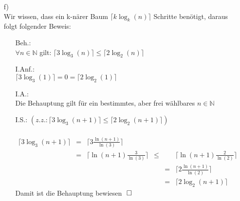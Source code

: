 \documentclass[a4paper,11pt,fleqn]{scrartcl}
\begin{document}
\begin{enumerate}
\begin{enumerate}
			\item[f)]\quad \\
				Wir wissen, dass ein k-närer Baum $\lceil k\log_k(n)\rceil$ Schritte benötigt, 
				daraus folgt folgender Beweis:
				\begin{enumerate}
					\item[Beh.:]\quad \\
						\(\forall n\in\mathbb{N}\) gilt: \(\lceil 3\log_3(n)\rceil\leq 
						\lceil 2\log_2(n)\rceil\)
					\item[I.Anf.:]\quad \\
						\(\lceil 3\log_3(1)\rceil = 0 = \lceil 2\log_2(1)\rceil\)
					\item[I.A.:]\quad \\
						Die Behauptung gilt für ein bestimmtes, aber frei wählbares 
						\(n\in\mathbb{N}\)
					\newpage
					\item[I.S.:] \((z.z.: \lceil 3\log_3(n+1)\rceil\leq\lceil 2\log_2(n+1)
						\rceil)\) \\ \\
						\(
						\begin{array}{rclccl}
							\lceil3\log_3(n+1)\rceil &=& \big\lceil 3\frac{\ln(n+1)}{\ln(3)} 
							\big\rceil \\
							&=&\big\lceil \ln(n+1)\frac{3}{\ln(3)} \big\rceil
							&\leq &&
							\big\lceil \ln(n+1)\frac{2}{\ln(2)} \big\rceil \\	
							&&&&=& \big\lceil 2\frac{\ln(n+1)}{\ln(2)} \big\rceil \\
							&&&&=& \lceil 2\log_2(n+1) \rceil
						\end{array}
						\) \\
						Damit ist die Behauptung bewiesen $\qed$
				\end{enumerate}
		\end{enumerate}
		

\end{enumerate}
\end{document}
